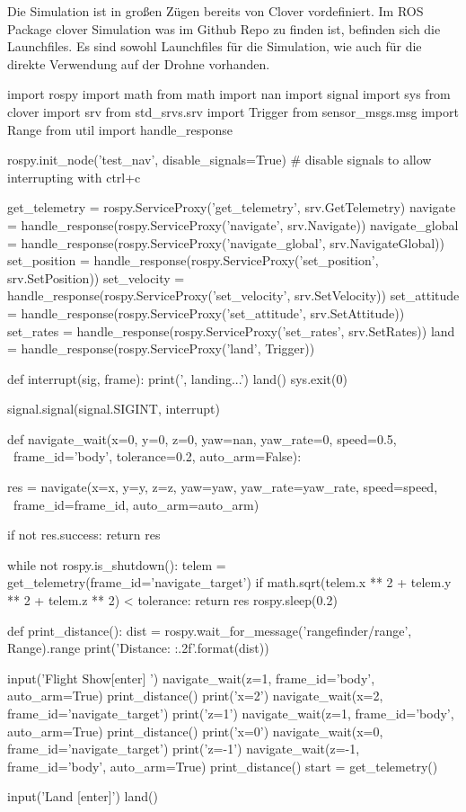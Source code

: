 Die Simulation ist in großen Zügen bereits von Clover vordefiniert. Im ROS Package clover Simulation was im Github Repo \cite{coex_clover_git} zu finden ist, befinden sich die Launchfiles. Es sind sowohl Launchfiles für die Simulation, wie auch für die direkte Verwendung auf der Drohne vorhanden.\\



\begin{python}[breaklines=true, label=lst:steuerungDrohne, caption={ Pythonskript zum Steuern der Drohne}]
import rospy
import math
from math import nan
import signal
import sys
from clover import srv
from std_srvs.srv import Trigger
from sensor_msgs.msg import Range
from util import handle_response

rospy.init_node('test_nav', disable_signals=True) # disable signals to allow interrupting with ctrl+c

get_telemetry = rospy.ServiceProxy('get_telemetry', srv.GetTelemetry)
navigate = handle_response(rospy.ServiceProxy('navigate', srv.Navigate))
navigate_global = handle_response(rospy.ServiceProxy('navigate_global', srv.NavigateGlobal))
set_position = handle_response(rospy.ServiceProxy('set_position', srv.SetPosition))
set_velocity = handle_response(rospy.ServiceProxy('set_velocity', srv.SetVelocity))
set_attitude = handle_response(rospy.ServiceProxy('set_attitude', srv.SetAttitude))
set_rates = handle_response(rospy.ServiceProxy('set_rates', srv.SetRates))
land = handle_response(rospy.ServiceProxy('land', Trigger))

def interrupt(sig, frame):
    print('\nInterrupted, landing...')
    land()
    sys.exit(0)

signal.signal(signal.SIGINT, interrupt)

def navigate_wait(x=0, y=0, z=0, yaw=nan, yaw_rate=0, speed=0.5, \
        frame_id='body', tolerance=0.2, auto_arm=False):

    res = navigate(x=x, y=y, z=z, yaw=yaw, yaw_rate=yaw_rate, speed=speed, \
        frame_id=frame_id, auto_arm=auto_arm)

    if not res.success:
        return res

    while not rospy.is_shutdown():
        telem = get_telemetry(frame_id='navigate_target')
        if math.sqrt(telem.x ** 2 + telem.y ** 2 + telem.z ** 2) < tolerance:
            return res
        rospy.sleep(0.2)

def print_distance():
    dist = rospy.wait_for_message('rangefinder/range', Range).range
    print('Distance: {:.2f}'.format(dist))

input('Flight Show[enter] ')
navigate_wait(z=1, frame_id='body', auto_arm=True)
print_distance()
print('x=2')
navigate_wait(x=2, frame_id='navigate_target')
print('z=1')
navigate_wait(z=1, frame_id='body', auto_arm=True)
print_distance()
print('x=0')
navigate_wait(x=0, frame_id='navigate_target')
print('z=-1')
navigate_wait(z=-1, frame_id='body', auto_arm=True)
print_distance()
start = get_telemetry()

input('Land [enter]')
land()
\end{python}

